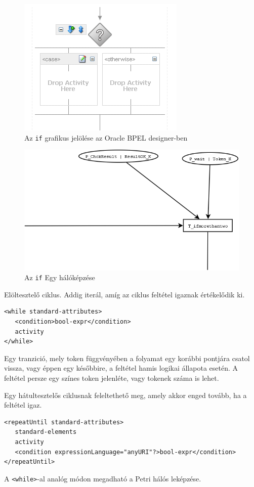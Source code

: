\begin{figure}[h!]
\centering
\includegraphics[scale=1]{images/if.png}
\caption{Az \texttt{if} grafikus jelölése az Oracle BPEL designer-ben}
\label{fig:if}
\end{figure}


\begin{figure}[h!]
\centering
\includegraphics[scale=0.4]{images/ifnet.png}
\caption{Az \texttt{if} Egy hálóképzése}
\label{fig:ifnet}
\end{figure}

Elöltesztelő ciklus. Addig iterál, amíg az ciklus feltétel igaznak értékelődik ki. 
\begin{verbatim}
<while standard-attributes>
   <condition>bool-expr</condition>
   activity
</while>
\end{verbatim}
Egy tranzició, mely token függvényében a folyamat egy korábbi pontjára csatol vissza, vagy éppen egy későbbire, a feltétel hamis logikai állapota esetén. A feltétel persze egy színes token jelenléte, vagy tokenek száma is lehet. 

Egy hátultesztelős ciklusnak feleltethető meg, amely akkor enged tovább, ha a feltétel igaz. 
\begin{verbatim}
<repeatUntil standard-attributes>
   standard-elements
   activity
   <condition expressionLanguage="anyURI"?>bool-expr</condition>
</repeatUntil>
\end{verbatim}
A \texttt{<while>}-al analóg módon megadható a Petri hálós leképzése.

